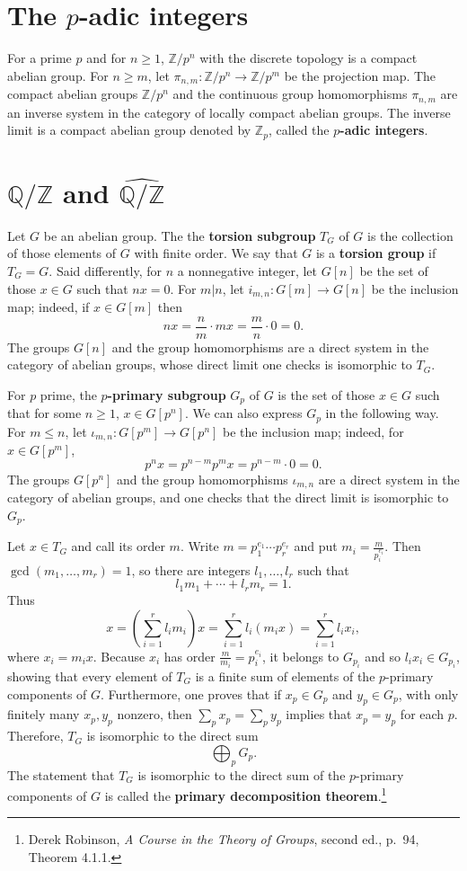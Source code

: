 \documentclass{article}
\theoremstyle{definition}
\begin{document}
\section{The $p$-adic integers}
For a prime $p$ and for $n \geq 1$, $\mathbb{Z}/p^n$ with the discrete topology is a compact abelian 
group. For $n \geq m$, let $\pi_{n,m}:\mathbb{Z}/p^n \to \mathbb{Z}/p^m$ be the projection
map. The 
compact abelian groups $\mathbb{Z}/p^n$ and the continuous group homomorphisms
$\pi_{n,m}$ are an inverse system in the category of locally compact abelian groups.
The inverse limit is a compact abelian group denoted by $\mathbb{Z}_p$, called the \textbf{$p$-adic integers}. 



\section{$\mathbb{Q}/\mathbb{Z}$ and $\widehat{\mathbb{Q}/\mathbb{Z}}$}
Let $G$ be an abelian group. The
the \textbf{torsion subgroup}  $T_G$ of $G$ 
 is the collection of those elements of $G$ with finite order. We say that $G$ is a \textbf{torsion group} if $T_G=G$. Said differently, for $n$ a nonnegative integer, let $G[n]$ be the set of those $x \in G$ such that
$nx=0$. 
For $m|n$, let $i_{m,n}:G[m] \to G[n]$ be the inclusion map; indeed, if $x \in G[m]$ then
\[
nx = \frac{n}{m} \cdot mx = \frac{m}{n} \cdot 0=0.
\]
 The  groups $G[n]$ and the group homomorphisms are a direct system in the category of abelian groups,
whose direct limit one checks is isomorphic to $T_G$. 

For $p$ prime, the \textbf{$p$-primary subgroup} $G_p$ of $G$ is the set of those $x \in G$ such that for some $n \geq 1$,
$x \in G[p^n]$. 
We can also express $G_p$ in the following way.
For $m \leq n$, let $\iota_{m,n}:G[p^m] \to G[p^n]$ be the inclusion map; indeed, for $x \in G[p^m]$,
\[
p^n x = p^{n-m} p^m x = p^{n-m} \cdot 0 =0.
\]
The groups $G[p^n]$ and the group homomorphisms $\iota_{m,n}$ are a direct system in the category of abelian groups, and one checks that the direct limit
is isomorphic to $G_p$. 


Let $x \in T_G$ and call its order $m$. Write $m=p_1^{e_1} \cdots p_r^{e_r}$ and put
$m_i = \frac{m}{p_i^{e_i}}$. Then $\gcd(m_1,\ldots,m_r)=1$, so there are integers $l_1,\ldots,l_r$ such that
\[
l_1 m_1 + \cdots + l_r m_r = 1.
\]
Thus
\[
x = \left(\sum_{i=1}^r l_i m_i \right) x = \sum_{i=1}^r l_i (m_i x) = \sum_{i=1}^r l_i x_i,
\]
where $x_i = m_i x$. Because $x_i$ has order $\frac{m}{m_i}=p_i^{e_i}$, it belongs to $G_{p_i}$ and so $l_i x_i \in G_{p_i}$, showing
that every element of $T_G$ is a finite sum of elements of the $p$-primary components of $G$. Furthermore, one proves that if
$x_p \in G_p$ and $y_p \in G_p$, with only finitely many $x_p, y_p$ nonzero, then
$\sum_p x_p = \sum_p y_p$ implies that $x_p=y_p$ for each $p$. Therefore, $T_G$ is isomorphic to the direct sum
\[
\bigoplus_p G_p.
\]
The statement that $T_G$ is isomorphic to the direct sum of the $p$-primary components of $G$ is called the \textbf{primary
decomposition theorem}.\footnote{Derek Robinson, {\em A Course in the Theory of Groups}, second ed.,
p.~94, Theorem 4.1.1.}
\end{document}
